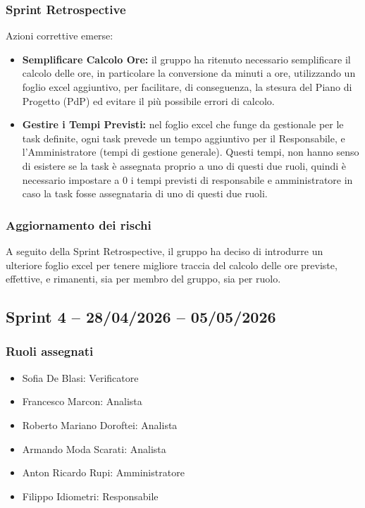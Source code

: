 \subsubsection{Sprint Retrospective}
Azioni correttive emerse:
\begin{itemize}
    \item \textbf{Semplificare Calcolo Ore:} il gruppo ha ritenuto necessario semplificare il calcolo delle ore, in particolare la conversione da minuti a ore, utilizzando un foglio excel aggiuntivo, per facilitare, di conseguenza, la stesura del Piano di Progetto (PdP) ed evitare il più possibile errori di calcolo.
    \item \textbf{Gestire i Tempi Previsti:} nel foglio excel che funge da gestionale per le task definite, ogni task prevede un tempo aggiuntivo per il Responsabile, e l'Amministratore (tempi di gestione generale). Questi tempi, non hanno senso di esistere se la task è assegnata proprio a uno di questi due ruoli, quindi è necessario impostare a 0 i tempi previsti di responsabile e amministratore in caso la task fosse assegnataria di uno di questi due ruoli.
\end{itemize}

\subsubsection{Aggiornamento dei rischi}
A seguito della Sprint Retrospective, il gruppo ha deciso di introdurre un ulteriore foglio excel per tenere migliore traccia del calcolo delle ore previste, effettive, e rimanenti, sia per membro del gruppo, sia per ruolo.

\subsection{Sprint 4 -- 28/04/2026 -- 05/05/2026}
\label{sec:sprint4}

\subsubsection{Ruoli assegnati}
\begin{itemize}
    \item Sofia De Blasi: Verificatore
    \item Francesco Marcon: Analista
    \item Roberto Mariano Doroftei: Analista
    \item Armando Moda Scarati: Analista
    \item Anton Ricardo Rupi: Amministratore
    \item Filippo Idiometri: Responsabile
\end{itemize}

